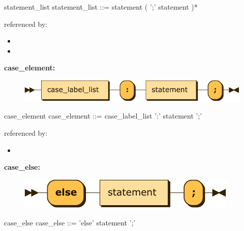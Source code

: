 \documentclass[10pt,a4paper,twoside]{article}
\providecommand{\tightlist}{%
  \setlength{\itemsep}{0pt}\setlength{\parskip}{0pt}}
\newcounter{grammarbox}[section]
\begin{document}
\begin{grammarbox}{statement\_list}
\vspace{0.5em}
statement\_list
         ::= statement ( ';' statement )*
\end{grammarbox}

referenced by:

\begin{itemize}
\tightlist
\item
\item
\end{itemize}

\textbf{case\_element:}

\begin{figure}[H]
\centering
\includegraphics{diagram/case_element.pdf}

\end{figure}

\begin{grammarbox}{case\_element}
\vspace{0.5em}
case\_element
         ::= case\_label\_list ':' statement ';'
\end{grammarbox}

referenced by:

\begin{itemize}
\tightlist
\item
\end{itemize}

\textbf{case\_else:}

\begin{figure}[H]
\centering
\includegraphics{diagram/case_else.pdf}

\end{figure}

\begin{grammarbox}{case\_else}
\vspace{0.5em}
case\_else
         ::= 'else' statement ';'
\end{grammarbox}
\end{document}
